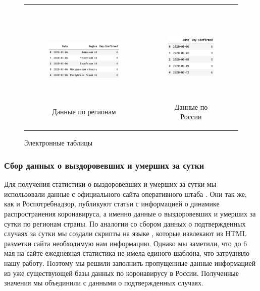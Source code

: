 \documentclass[a4paper, 12pt]{extarticle}
\begin{document}
\begin{figure}[h]
    \centering
    \begin{tabular}[c]{cc}
    \begin{subfigure}[b]{0.49\textwidth} \centering
        \includegraphics[height=130pt]{../plots/regions_df1.png}
        \caption{Данные по регионам} \label{fig:regions_df1}
    \end{subfigure}&

    \begin{subfigure}[b]{0.49\textwidth} \centering
        \includegraphics[height=130pt]{../plots/country_df1.png}
        \caption{Данные по России} \label{fig:country_df1}
    \end{subfigure}
    \end{tabular}
    \caption{Электронные таблицы} \label{fig:collection1_res}
\end{figure}

\subsubsection{Сбор данных о выздоровевших и умерших за сутки}

Для получения статистики о выздоровевших и умерших за сутки мы использовали
данные с официального сайта оперативного штаба .
Они так же, как и Роспотребнадзор, публикуют статьи с информацией о динамике
распространения коронавируса, а именно данные о выздоровевших и умерших за
сутки по регионам страны. По аналогии со сбором данных о подтвержденных случаях
за сутки мы создали скрипты на языке , которые извлекают из
HTML разметки сайта необходимую нам информацию. Однако мы заметили, что до 6
мая на сайте  ежедневная статистика не имела
единого шаблона, что затрудняло нашу работу. Поэтому мы решили заполнить
пропущенные данные информацией из уже существующей базы данных по коронавирусу
в России. Полученные значения мы объединили с данными о подтвержденных случаях.
\end{document}
